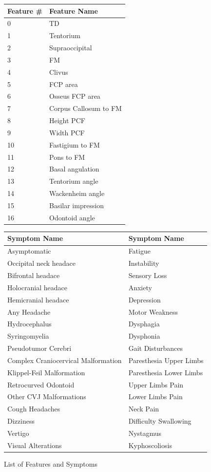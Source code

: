 \documentclass[10pt]{article}
\begin{document}
\begin{figure}[H]
	\noindent
	\begin{tabular}{ll}
		\toprule
		Feature \# & Feature Name \\
		\midrule
		0 & TD \\
		1 & Tentorium \\
		2 & Supraoccipital \\
		3 & FM \\
		4 & Clivus \\
		5 & FCP area \\
		6 & Osseus FCP area \\
		7 & Corpus Callosum to FM \\
		8 & Height PCF \\
		9 & Width PCF \\
		10 & Fastigium to FM \\
		11 & Pons to FM \\
		12 & Basal angulation \\
		13 & Tentorium angle \\
		14 & Wackenheim angle \\
		15 & Basilar impression \\
		16 & Odontoid angle \\
		\bottomrule
	\end{tabular}
	\hspace{5em}
	\begin{tabular}{ll}
		\toprule
		Symptom Name & Symptom Name \\
		\midrule
		Asymptomatic &  Fatigue \\ 
		Occipital neck headace &        Instability \\ 
		Bifrontal headace &     Sensory Loss \\ 
		Holocranial headace &   Anxiety \\ 
		Hemicranial headace &   Depression \\ 
		Any Headache &  Motor Weakness \\ 
		Hydrocephalus &         Dysphagia \\ 
		Syringomyelia &         Dysphonia \\ 
		Pseudotumor Cerebri &   Gait Disturbances \\ 
		Complex Craniocervical Malformation &   Paresthesia Upper Limbs \\ 
		Klippel-Feil Malformation &     Paresthesia Lower Limbs \\ 
		Retrocurved Odontoid &  Upper Limbs Pain \\ 
		Other CVJ Malformations &       Lower Limbs Pain \\ 
		Cough Headaches &       Neck Pain \\ 
		Dizziness &     Difficulty Swallowing \\ 
		Vertigo &       Nystagmus \\ 
		Visual Alterations &    Kyphoscoliosis \\
		\bottomrule
	\end{tabular}
	\caption{List of Features and Symptoms}
\end{figure}
\end{document}
